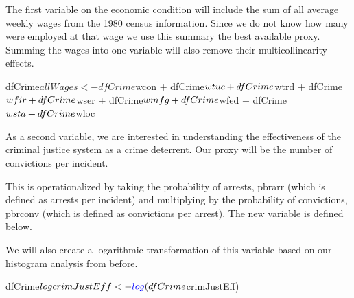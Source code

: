 \documentclass[]{article}
\newenvironment{Shaded}{}{}
\newcommand{\KeywordTok}[1]{\textcolor[rgb]{0.00,0.00,1.00}{#1}}
\newcommand{\NormalTok}[1]{#1}
\newcommand{\OperatorTok}[1]{#1}
\newcommand{\StringTok}[1]{\textcolor[rgb]{0.00,0.50,0.50}{#1}}
\begin{document}
The first variable on the economic condition will include the sum of all
average weekly wages from the 1980 census information. Since we do not
know how many were employed at that wage we use this summary the best
available proxy. Summing the wages into one variable will also remove
their multicollinearity effects.

\begin{Shaded}
\begin{Highlighting}[]
\NormalTok{dfCrime}\OperatorTok{$}\NormalTok{allWages<-dfCrime}\OperatorTok{$}\NormalTok{wcon }\OperatorTok{+}\StringTok{ }\NormalTok{dfCrime}\OperatorTok{$}\NormalTok{wtuc }\OperatorTok{+}\StringTok{ }\NormalTok{dfCrime}\OperatorTok{$}\NormalTok{wtrd }\OperatorTok{+}\StringTok{ }\NormalTok{dfCrime}\OperatorTok{$}\NormalTok{wfir }\OperatorTok{+}
\StringTok{    }\NormalTok{dfCrime}\OperatorTok{$}\NormalTok{wser }\OperatorTok{+}\StringTok{ }\NormalTok{dfCrime}\OperatorTok{$}\NormalTok{wmfg }\OperatorTok{+}\StringTok{ }\NormalTok{dfCrime}\OperatorTok{$}\NormalTok{wfed }\OperatorTok{+}\StringTok{ }\NormalTok{dfCrime}\OperatorTok{$}\NormalTok{wsta }\OperatorTok{+}\StringTok{ }\NormalTok{dfCrime}\OperatorTok{$}\NormalTok{wloc}
\end{Highlighting}
\end{Shaded}

As a second variable, we are interested in understanding the
effectiveness of the criminal justice system as a crime deterrent. Our
proxy will be the number of convictions per incident.

This is operationalized by taking the probability of arrests, pbrarr
(which is defined as arrests per incident) and multiplying by the
probability of convictions, pbrconv (which is defined as convictions per
arrest). The new variable is defined below.

\begin{Shaded}
\end{Shaded}

We will also create a logarithmic transformation of this variable based
on our histogram analysis from before.

\begin{Shaded}
\begin{Highlighting}[]
\NormalTok{dfCrime}\OperatorTok{$}\NormalTok{logcrimJustEff<-}\KeywordTok{log}\NormalTok{(dfCrime}\OperatorTok{$}\NormalTok{crimJustEff)}
\end{Highlighting}
\end{Shaded}
\end{document}
